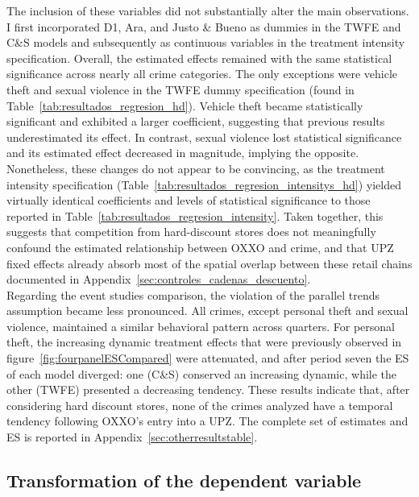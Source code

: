\documentclass[12pt]{article}
\begin{document}
The inclusion of these variables did not substantially alter the main observations. I first incorporated D1, Ara, and Justo \& Bueno as dummies in the TWFE and C\&S models and subsequently as continuous variables in the treatment intensity specification. Overall, the estimated effects remained with the same statistical significance across nearly all crime categories. The only exceptions were vehicle theft and sexual violence in the TWFE dummy specification (found in Table~\ref{tab:resultados_regresion_hd}). Vehicle theft became statistically significant and exhibited a larger coefficient, suggesting that previous results underestimated its effect. In contrast, sexual violence lost statistical significance and its estimated effect decreased in magnitude, implying the opposite. Nonetheless, these changes do not appear to be convincing, as the treatment intensity specification (Table~\ref{tab:resultados_regresion_intensitys_hd}) yielded virtually identical coefficients and levels of statistical significance to those reported in Table~\ref{tab:resultados_regresion_intensity}. Taken together, this suggests that competition from hard-discount stores does not meaningfully confound the estimated relationship between OXXO and crime, and that UPZ fixed effects already absorb most of the spatial overlap between these retail chains documented in Appendix~\ref{sec:controles_cadenas_descuento}.\\

Regarding the event studies comparison, the violation of the parallel trends assumption became less pronounced. All crimes, except personal theft and sexual violence, maintained a similar behavioral pattern across quarters. For personal theft, the increasing dynamic treatment effects that were previously observed in figure~\ref{fig:fourpanelESCompared} were attenuated, and after period seven the ES of each model diverged: one (C\&S) conserved an increasing dynamic, while the other (TWFE) presented a decreasing tendency. These results indicate that, after considering hard discount stores, none of the crimes analyzed have a temporal tendency following OXXO's entry into a UPZ. The complete set of estimates and ES is reported in Appendix~\ref{sec:otherresultstable}.

\subsection{Transformation of the dependent variable}
\label{sec:transformation}
\end{document}
